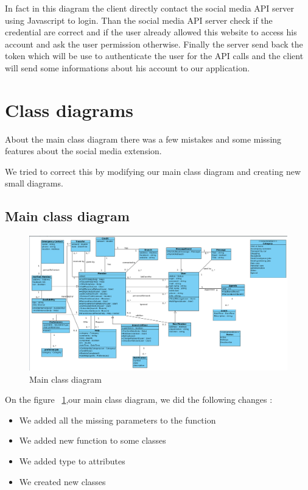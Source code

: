 \documentclass[11pt, a4paper]{article}   	%
\begin{document}
In fact in this diagram the client directly contact the social media API server using Javascript to login. Than the social media API server check if the credential are correct and if the user already allowed this website to access his account and ask the user permission otherwise. 
Finally the server send back the token which will be use to authenticate the user for the API calls and the client will send some informations about his account to our application.


\section{Class diagrams}

About the main class diagram there was a few mistakes and some missing features about the social media extension. 

We tried to correct this by modifying our main class diagram and creating new small diagrams.


\subsection{Main class diagram}

\begin{figure}[!ht]
   \includegraphics[width=\textwidth]{phase3MainClassDiagram.png}
   \caption{\label{phase3MainClassDiagram} Main class diagram}
\end{figure}


On the figure ~\ref{phase3MainClassDiagram},our main class diagram, we did the following changes :

\begin{itemize}
\item We added all the missing parameters to the function
\item We added new function to some classes 
\item We added type to attributes
\item We created new classes
\end{itemize}
\end{document}
